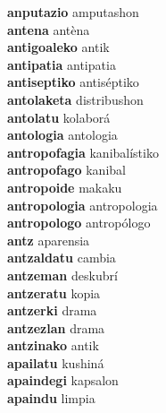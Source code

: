 \textbf{anputazio } amputashon \\
\textbf{antena } antèna \\
\textbf{antigoaleko } antik \\
\textbf{antipatia } antipatia \\
\textbf{antiseptiko } antiséptiko \\
\textbf{antolaketa } distribushon \\
\textbf{antolatu } kolaborá \\
\textbf{antologia } antologia \\
\textbf{antropofagia } kanibalístiko \\
\textbf{antropofago } kanibal \\
\textbf{antropoide } makaku \\
\textbf{antropologia } antropologia \\
\textbf{antropologo } antropólogo \\
\textbf{antz } aparensia \\
\textbf{antzaldatu } cambia \\
\textbf{antzeman } deskubrí \\
\textbf{antzeratu } kopia \\
\textbf{antzerki } drama \\
\textbf{antzezlan } drama \\
\textbf{antzinako } antik \\
\textbf{apailatu } kushiná \\
\textbf{apaindegi } kapsalon \\
\textbf{apaindu } limpia \\
